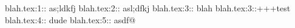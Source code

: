  blah.tex:1:: as;ldkfj
blah.tex:2:: asl;dfkj
blah.tex:3:: blah
blah.tex:3::+++test
blah.tex:4:: dude
blah.tex:5:: asdf@